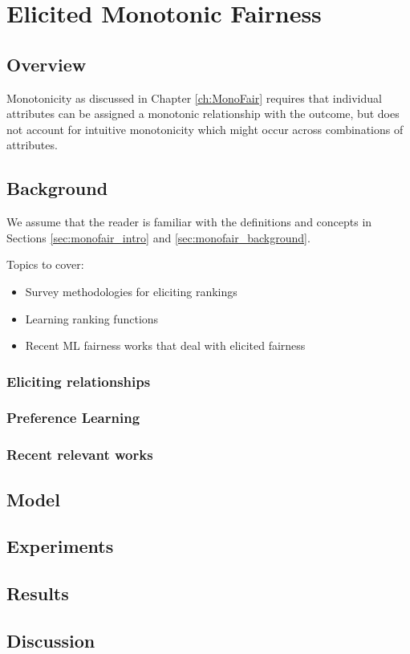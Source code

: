 \chapter{Elicited Monotonic Fairness}
\label{ch:SoftMonoFair}

\section{Overview}

    Monotonicity as discussed in Chapter \ref{ch:MonoFair} requires that individual attributes can be assigned a monotonic relationship with the outcome, but does not account for intuitive monotonicity which might occur across combinations of attributes.  

\section{Background}\label{sec:softmono_bg}
    
    We assume that the reader is familiar with the definitions and concepts in Sections \ref{sec:monofair_intro} and \ref{sec:monofair_background}.
    
    Topics to cover:
    \begin{itemize}
        \item Survey methodologies for eliciting rankings
        \item Learning ranking functions
        \item Recent ML fairness works that deal with elicited fairness
    \end{itemize}
    
    \subsection{Eliciting relationships}
    
    \subsection{Preference Learning}
    
    \subsection{Recent relevant works}
    
\section{Model}\label{sec:softmono_model}

    

\section{Experiments}\label{sec:softmono_experiments}

    

\section{Results}\label{sec:softmono_results}
    

\section{Discussion}\label{sec:softmono_discussion}
